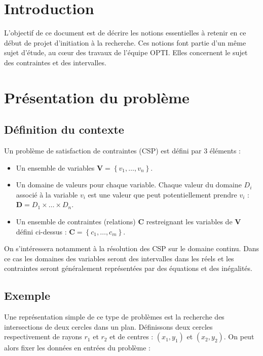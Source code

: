 \section{Introduction }
L'objectif de ce document est de décrire les notions essentielles à retenir en ce début de projet d'initiation à la recherche. Ces notions font partie d'un même sujet d'étude, au cœur des travaux de l'équipe \textsc{OPTI}. Elles concernent le sujet des contraintes et des intervalles. %

\section{Présentation du problème}
\subsection{Définition du contexte}
Un problème de satisfaction de contraintes (\textsc{CSP}) est défini par 3 éléments : 
\begin{itemize}
\item
Un ensemble de variables $\mathbf{V} = \left\{ v_1, \dots ,v_n \right\}$.
\item
Un domaine de valeurs pour chaque variable. Chaque valeur du domaine $D_i$ associé à la variable $v_i$ est une valeur que peut potentiellement prendre $v_i$ : $\mathbf{D} = D_1 \times \dots \times D_n $.
\item
Un ensemble de contraintes (relations) $\mathbf{C}$ restreignant les variables de $\mathbf{V}$ défini ci-dessus :  $\mathbf{C} = \left\{c_1, \dots ,c_m\right\}$. 
\end{itemize}

On s'intéressera notamment à la résolution des \textsc{CSP} sur le domaine continu. Dans ce cas les domaines des variables seront des intervalles dans les réels et les contraintes seront généralement représentées par des équations et des inégalités. 

\subsection{Exemple}

Une représentation simple de ce type de problèmes est la recherche des intersections de deux cercles dans un plan. Définissons deux cercles respectivement de rayons  $r_1$ et $r_2$ et de centres : $(x_1,y_1)$ et $(x_2,y_2)$.
On peut alors fixer les données en entrées du problème :

